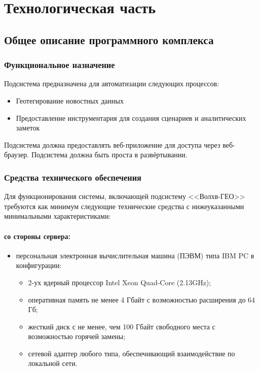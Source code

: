 \section{Технологическая часть}

\subsection{Общее описание программного комплекса}
\subsubsection{Функциональное назначение}

Подсистема предназначена для автоматизации следующих процессов:
\begin{itemize}
\item Геотегирование новостных данных
\item Предоставление инструментария для создания сценариев и аналитических заметок
\end{itemize}

Подсистема должна предоставлять веб-приложение для доступа через веб-браузер.
Подсистема должна быть проста в развёртывании.

\subsubsection{Средства технического обеспечения}

Для функционирования системы, включающей подсистему <<Волхв-ГЕО>> требуются как минимум следующие технические средства с нижеуказанными минимальными характеристиками:
\paragraph*{со стороны сервера:} \hfill


\begin{itemize}
\item персональная электронная вычислительная машина (ПЭВМ) типа IBM PC в
конфигурации:

\begin{itemize}
\item 2-ух ядерный процессор Intel Xeon Quad-Core (2.13GHz);
\item оперативная память не менее 4 Гбайт с возможностью расширения до 64 Гб;
\item жесткий диск с не менее, чем 100 Гбайт свободного места с возможностью горячей замены;
\item сетевой адаптер любого типа, обеспечивающий взаимодействие по локальной сети.
\end{itemize}
\end{itemize}

